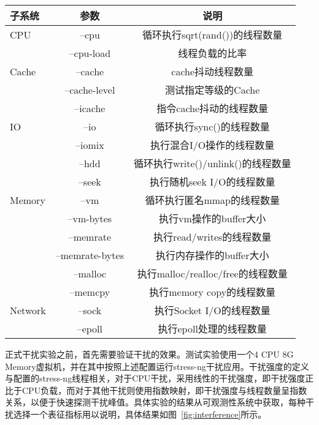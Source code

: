 \begin{table}[H]
    \label{tab:arg_list}
    \footnotesize%
    \setlength{\tabcolsep}{4pt}%
    \renewcommand{\arraystretch}{1.5}%
    \centering
    \begin{tabular}{lcc}
        \hline
        子系统 & 参数 & 说明\\
        \hline
        CPU	    & --cpu & 循环执行sqrt(rand())的线程数量\\
	            & --cpu-load & 线程负载的比率\\
        Cache	& --cache & cache抖动线程数量\\
	            & --cache-level	&测试指定等级的Cache\\
	            & --icache	&指令cache抖动的线程数量\\
        IO	    & --io	&循环执行sync()的线程数量\\
	            & --iomix	&执行混合I/O操作的线程数量\\
	            & --hdd	&循环执行write()/unlink()的线程数量\\
	            & --seek	&执行随机seek I/O的线程数量\\
        Memory	& --vm	&循环执行匿名mmap的线程数量\\
	            & --vm-bytes	&执行vm操作的buffer大小\\
	            & --memrate	&执行read/writes的线程数量\\
	            & --memrate-bytes	&执行内存操作的buffer大小\\
	            & --malloc	&执行malloc/realloc/free的线程数量\\
	            & --memcpy	&执行memory copy的线程数量\\
        Network	& --sock	&执行Socket I/O的线程数量\\
	            & --epoll	&执行epoll处理的线程数量\\
        \hline
    \end{tabular}
\end{table}

正式干扰实验之前，首先需要验证干扰的效果。测试实验使用一个4 CPU 8G Memory虚拟机，并在其中按照上述配置运行stress-ng干扰应用。干扰强度的定义与配置的stress-ng线程相关，对于CPU干扰，采用线性的干扰强度，即干扰强度正比于CPU负载，而对于其他干扰则使用指数映射，即干扰强度与线程数量呈指数关系，以便于快速探测干扰峰值。具体实验的结果从可观测性系统中获取，每种干扰选择一个表征指标用以说明，具体结果如图~\ref{fig:interference}所示。

